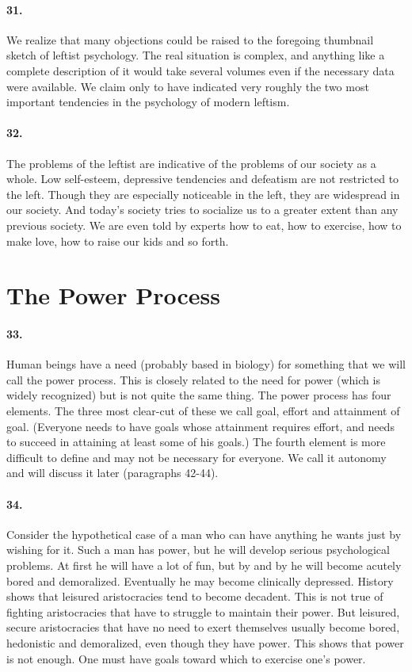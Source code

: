 \documentclass[12pt]{book}
\newcommand{\mysection}[1]{\section*{#1} \addcontentsline{toc}{section}{#1}}
\begin{document}
\paragraph{31.}  We realize that many objections could be raised to the foregoing thumbnail sketch of leftist psychology. The real situation is complex, and anything like a complete description of it would take several volumes even if the necessary data were available. We claim only to have indicated very roughly the two most important tendencies in the psychology of modern leftism.


\paragraph{32.}  The problems of the leftist are indicative of the problems of our society as a whole. Low self-esteem, depressive tendencies and defeatism are not restricted to the left. Though they are especially noticeable in the left, they are widespread in our society. And today's society tries to socialize us to a greater extent than any previous society. We are even told by experts how to eat, how to exercise, how to make love, how to raise our kids and so forth.

\mysection{The Power Process}


\paragraph{33.} Human beings have a need (probably based in biology) for something that we will call the power process. This is closely related to the need for power (which is widely recognized) but is not quite the same thing. The power process has four elements. The three most clear-cut of these we call goal, effort and attainment of goal. (Everyone needs to have goals whose attainment requires effort, and needs to succeed in attaining at least some of his goals.) The fourth element is more difficult to define and may not be necessary for everyone. We call it autonomy and will discuss it later (paragraphs 42-44).


\paragraph{34.} Consider the hypothetical case of a man who can have anything he wants just by wishing for it. Such a man has power, but he will develop serious psychological problems. At first he will have a lot of fun, but by and by he will become acutely bored and demoralized. Eventually he may become clinically depressed. History shows that leisured aristocracies tend to become decadent. This is not true of fighting aristocracies that have to struggle to maintain their power. But leisured, secure aristocracies that have no need to exert themselves usually become bored, hedonistic and demoralized, even though they have power. This shows that power is not enough. One must have goals toward which to exercise one's power.
\end{document}
